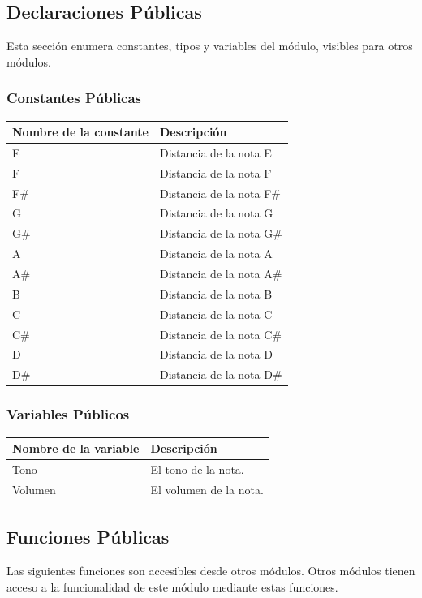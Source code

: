 \documentclass[a4paper,10pt]{article}
\begin{document}
\subsection{Declaraciones Públicas}
Esta sección enumera constantes, tipos y variables del módulo, visibles para
otros módulos.
\subsubsection{Constantes Públicas}
\begin{tabular}{| p{30mm} | p{10cm} |}
        \hline
        \textbf{Nombre de la \mbox{constante}} & \textbf{Descripción} \\
        \hline
        E & Distancia de la nota E\\
        F & Distancia de la nota F\\
        F\# & Distancia de la nota F\#\\
        G & Distancia de la nota G\\
        G\# & Distancia de la nota G\#\\
        A & Distancia de la nota A\\
        A\# & Distancia de la nota A\#\\
        B & Distancia de la nota B\\
        C & Distancia de la nota C\\
        C\# & Distancia de la nota C\#\\
        D & Distancia de la nota D\\
        D\# & Distancia de la nota D\#\\
        \hline
\end{tabular}

                

\subsubsection{Variables Públicos}
\begin{tabular}{| p{30mm} | p{10cm} |}
        \hline
        \textbf{Nombre de la \mbox{variable}} & \textbf{Descripción} \\
        \hline
        Tono & El tono de la nota.\\
        Volumen & El volumen de la nota.\\
        \hline
\end{tabular}
\subsection{Funciones Públicas}
Las siguientes funciones son accesibles desde otros módulos. Otros módulos
tienen acceso a la funcionalidad de este módulo mediante estas funciones.
~\\
\end{document}

